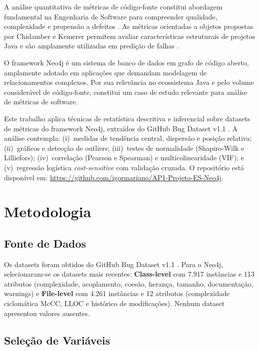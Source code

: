 \documentclass[12pt]{article}
\begin{document}
A análise quantitativa de métricas de código-fonte constitui abordagem fundamental na Engenharia de Software para compreender qualidade, complexidade e propensão a defeitos \cite{pressman2014}. As métricas orientadas a objetos propostas por Chidamber e Kemerer \cite{chidamber1994} permitem avaliar características estruturais de projetos Java e são amplamente utilizadas em predição de falhas \cite{gyimothy2005, basili1996}.

O framework Neo4j é um sistema de banco de dados em grafo de código aberto, amplamente adotado em aplicações que demandam modelagem de relacionamentos complexos. Por sua relevância no ecossistema Java e pelo volume considerável de código-fonte, constitui um caso de estudo relevante para análise de métricas de software.

Este trabalho aplica técnicas de estatística descritiva e inferencial sobre datasets de métricas do framework Neo4j, extraídos do GitHub Bug Dataset v1.1 \cite{toth2016}. A análise contempla: (i)~medidas de tendência central, dispersão e posição relativa; (ii)~gráficos e detecção de outliers; (iii)~testes de normalidade (Shapiro-Wilk e Lilliefors); (iv)~correlação (Pearson e Spearman) e multicolinearidade (VIF); e (v)~regressão logística \textit{cost-sensitive} com validação cruzada. O repositório está disponível em: \url{https://github.com/igormariano/AP1-Projeto-ES-Neo4j}.

\section{Metodologia} \label{sec:metodo}

\subsection{Fonte de Dados}

Os datasets foram obtidos do GitHub Bug Dataset v1.1 \cite{toth2016}. Para o Neo4j, selecionaram-se os datasets mais recentes: \textbf{Class-level} com 7.917 instâncias e 113 atributos (complexidade, acoplamento, coesão, herança, tamanho, documentação, warnings) e \textbf{File-level} com 4.261 instâncias e 12 atributos (complexidade ciclomática McCC, LLOC e histórico de modificações). Nenhum dataset apresentou valores ausentes.

\subsection{Seleção de Variáveis}
\end{document}
